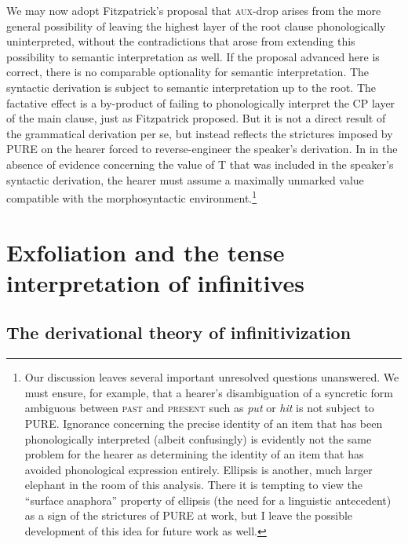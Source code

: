 \documentclass[output=paper]{langscibook}
\begin{document}
We may now adopt Fitzpatrick's proposal that \textsc{aux}-drop arises from the more general possibility of leaving the highest layer of the root clause phonologically uninterpreted, without the contradictions that arose from extending this possibility to semantic interpretation as well. If the proposal advanced here is correct, there is no comparable optionality for semantic interpretation. The syntactic derivation is subject to semantic interpretation up to the root. The factative effect is a by-product of failing to phonologically interpret the CP layer of the main clause, just as Fitzpatrick proposed. But it is not a direct result of the grammatical derivation per se, but instead reflects the strictures imposed by PURE on the hearer forced to reverse-engineer the speaker's derivation. In in the absence of evidence concerning the value of T that was included in the speaker's syntactic derivation, the hearer must assume a maximally unmarked value compatible with the morphosyntactic environment.\footnote{Our discussion leaves several important unresolved questions unanswered. We must ensure, for example, that a hearer's disambiguation of a syncretic form ambiguous between \textsc{past} and \textsc{present} such as \textit{put} or \textit{hit} is not subject to PURE. Ignorance concerning the precise identity of an item that has been phonologically interpreted (albeit confusingly) is evidently not the same problem for the hearer as determining the identity of an item that has avoided phonological expression entirely. Ellipsis is another, much larger elephant in the room of this analysis. There it is tempting to view the “surface anaphora” property of ellipsis (the need for a linguistic antecedent) as a sign of the strictures of PURE at work, but I leave the possible development of this idea for future work as well.}

\section{Exfoliation and the tense interpretation of infinitives}

\subsection{The derivational theory of infinitivization}
\end{document}
